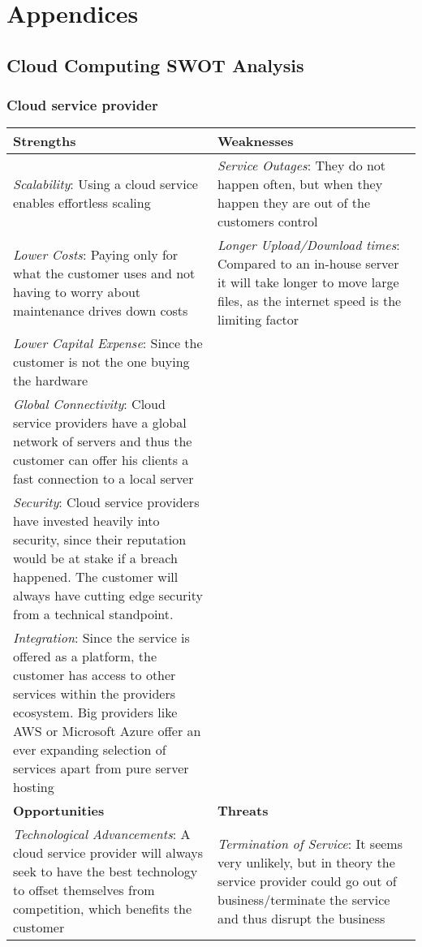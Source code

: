 \section{Appendices}
\subsection{Cloud Computing SWOT Analysis}
\label{app:swot}
\subsubsection{Cloud service provider}

\renewcommand{\arraystretch}{1.5}
\begin{center}
\begin{tabular}{ | p{0.5\linewidth} | p{0.5\linewidth} | } 
 \hline
 \textbf{Strengths} & \textbf{Weaknesses}\\ 
\hline
 \textit{Scalability}: Using a cloud service enables effortless scaling & \textit{Service Outages}: They do not happen often, but when they happen they are out of the customers control \\ 
\textit{Lower Costs}: Paying only for what the customer uses and not having to worry about maintenance drives down costs & \textit{Longer Upload/Download times}:  Compared to an in-house server it will take longer to move large files, as the internet speed is the limiting factor\\
\textit{Lower Capital Expense}: Since the customer is not the one buying the hardware & \\ 
 \textit{Global Connectivity}: Cloud service providers have a global network of servers and thus the customer can offer his clients a fast connection to a local server & \\
 \textit{Security}: Cloud service providers have invested heavily into security, since their reputation would be at stake if a breach happened. The customer will always have cutting edge security from a technical standpoint. & \\
 \textit{Integration}: Since the service is offered as a platform, the customer has access to other services within the providers ecosystem. Big providers like AWS or Microsoft Azure offer an ever expanding selection of services apart from pure server hosting & \\
 \hline
 \textbf{Opportunities} & \textbf{Threats}  \\ 
 \hline
\textit{Technological Advancements}: A cloud service provider will always seek to have the best technology to offset themselves from competition, which benefits the customer & \textit{Termination of Service}: It seems very unlikely, but in theory the service provider could go out of business/terminate the service and thus disrupt the business \\
\hline 
\end{tabular}
\end{center}

